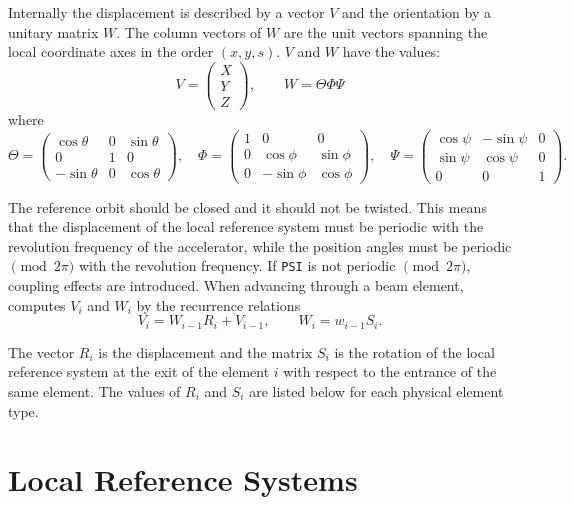 Internally the displacement is described by a vector $V$
and the orientation by a unitary matrix $W$.
The column vectors of $W$ are the unit vectors spanning 
the local coordinate axes in the order $(x, y, s)$.
$V$ and $W$ have the values:
\[
V=\left(\begin{array}{c}
    X \\
    Y \\
    Z
  \end{array}\right),
\qquad
W=\Theta\Phi\Psi
\]
where
\[
\Theta=\left(\begin{array}{ccc}
    \cos\theta &  0 &  \sin\theta \\
    0         &  1 &   0 \\
    -\sin\theta &  0 &  \cos\theta
  \end{array}\right),
\quad
\Phi=\left(\begin{array}{ccc}
    1 &  0        &  0 \\
    0 &  \cos\phi &  \sin\phi \\
    0 & -\sin\phi &  \cos\phi
  \end{array}\right),
\quad
\Psi=\left(\begin{array}{ccc}
    \cos\psi & -\sin\psi &  0 \\
    \sin\psi &  \cos\psi &  0 \\
    0        &  0        &  1
  \end{array}\right).
\]

The reference orbit should be closed and it should not be twisted.
This means that the displacement of the local reference system
must be periodic with the revolution frequency of the accelerator,
while the position angles must be periodic $\pmod{2\pi}$
with the revolution frequency.
If \texttt{PSI} is not periodic $\pmod{2\pi}$, 
coupling effects are introduced.
When advancing through a beam element,
\opalmap computes $V_i$ and $W_i$
by the recurrence relations
\[
V_i = W_{i-1}R_i + V_{i-1}, \qquad
W_i = w_{i-1}S_i.
\]

The vector $R_i$ is the displacement and the matrix
$S_i$ is the rotation of the local reference system 
at the exit of the element $i$ with respect to the entrance 
of the same element.
The values of $R_i$ and $S_i$
are listed below for each physical element type.

\section{Local Reference Systems}
